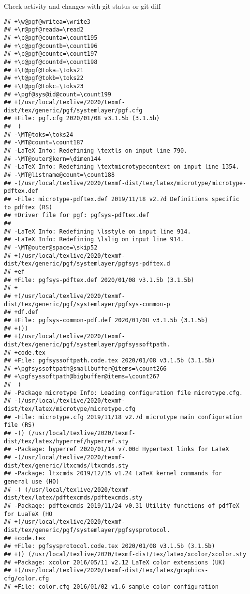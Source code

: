 \documentclass[ignorenonframetext,]{beamer}
\begin{document}
\begin{frame}[fragile]{Check activity and changes with git status or git
diff}
\begin{verbatim}
## +\w@pgf@writea=\write3
## +\r@pgf@reada=\read2
## +\c@pgf@counta=\count195
## +\c@pgf@countb=\count196
## +\c@pgf@countc=\count197
## +\c@pgf@countd=\count198
## +\t@pgf@toka=\toks21
## +\t@pgf@tokb=\toks22
## +\t@pgf@tokc=\toks23
## +\pgf@sys@id@count=\count199
## +(/usr/local/texlive/2020/texmf-dist/tex/generic/pgf/systemlayer/pgf.cfg
## +File: pgf.cfg 2020/01/08 v3.1.5b (3.1.5b)
##  )
## -\MT@toks=\toks24
## -\MT@count=\count187
## -LaTeX Info: Redefining \textls on input line 790.
## -\MT@outer@kern=\dimen144
## -LaTeX Info: Redefining \textmicrotypecontext on input line 1354.
## -\MT@listname@count=\count188
## -(/usr/local/texlive/2020/texmf-dist/tex/latex/microtype/microtype-pdftex.def
## -File: microtype-pdftex.def 2019/11/18 v2.7d Definitions specific to pdftex (RS)
## +Driver file for pgf: pgfsys-pdftex.def
##  
## -LaTeX Info: Redefining \lsstyle on input line 914.
## -LaTeX Info: Redefining \lslig on input line 914.
## -\MT@outer@space=\skip52
## +(/usr/local/texlive/2020/texmf-dist/tex/generic/pgf/systemlayer/pgfsys-pdftex.d
## +ef
## +File: pgfsys-pdftex.def 2020/01/08 v3.1.5b (3.1.5b)
## +
## +(/usr/local/texlive/2020/texmf-dist/tex/generic/pgf/systemlayer/pgfsys-common-p
## +df.def
## +File: pgfsys-common-pdf.def 2020/01/08 v3.1.5b (3.1.5b)
## +)))
## +(/usr/local/texlive/2020/texmf-dist/tex/generic/pgf/systemlayer/pgfsyssoftpath.
## +code.tex
## +File: pgfsyssoftpath.code.tex 2020/01/08 v3.1.5b (3.1.5b)
## +\pgfsyssoftpath@smallbuffer@items=\count266
## +\pgfsyssoftpath@bigbuffer@items=\count267
##  )
## -Package microtype Info: Loading configuration file microtype.cfg.
## -(/usr/local/texlive/2020/texmf-dist/tex/latex/microtype/microtype.cfg
## -File: microtype.cfg 2019/11/18 v2.7d microtype main configuration file (RS)
## -)) (/usr/local/texlive/2020/texmf-dist/tex/latex/hyperref/hyperref.sty
## -Package: hyperref 2020/01/14 v7.00d Hypertext links for LaTeX
## -(/usr/local/texlive/2020/texmf-dist/tex/generic/ltxcmds/ltxcmds.sty
## -Package: ltxcmds 2019/12/15 v1.24 LaTeX kernel commands for general use (HO)
## -) (/usr/local/texlive/2020/texmf-dist/tex/latex/pdftexcmds/pdftexcmds.sty
## -Package: pdftexcmds 2019/11/24 v0.31 Utility functions of pdfTeX for LuaTeX (HO
## +(/usr/local/texlive/2020/texmf-dist/tex/generic/pgf/systemlayer/pgfsysprotocol.
## +code.tex
## +File: pgfsysprotocol.code.tex 2020/01/08 v3.1.5b (3.1.5b)
## +)) (/usr/local/texlive/2020/texmf-dist/tex/latex/xcolor/xcolor.sty
## +Package: xcolor 2016/05/11 v2.12 LaTeX color extensions (UK)
## +(/usr/local/texlive/2020/texmf-dist/tex/latex/graphics-cfg/color.cfg
## +File: color.cfg 2016/01/02 v1.6 sample color configuration

\end{verbatim}
\end{frame}
\end{document}
